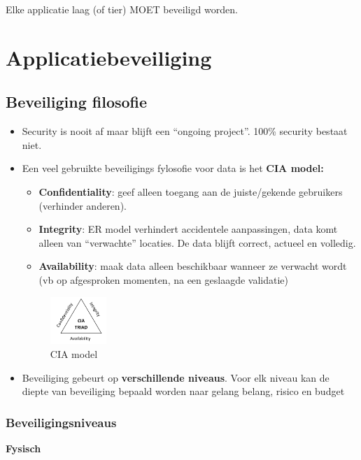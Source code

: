 \documentclass{article}
\newcommand{\bold}[1]{\textbf{#1}}
\begin{document}
Elke applicatie laag (of tier) MOET beveiligd worden.

\section{Applicatiebeveiliging}
\subsection{Beveiliging filosofie}
\begin{itemize}
    \item Security is nooit af maar blijft een “ongoing project”. 100\% security bestaat niet.
    \item Een veel gebruikte beveiligings fylosofie voor data is het \bold{CIA model:}
    \begin{itemize}
        \item \bold{Confidentiality}: geef alleen toegang aan de juiste/gekende gebruikers (verhinder anderen).
        \item \bold{Integrity}: ER model verhindert accidentele aanpassingen, data komt alleen van “verwachte” locaties. De data blijft correct, actueel en volledig.
        \item \bold{Availability}: maak data alleen beschikbaar wanneer ze verwacht wordt (vb op afgesproken momenten, na een geslaagde validatie)
    \end{itemize}

    \begin{figure}[H]
        \centering
        \includegraphics[width=0.2\textwidth]{ciamodel.png}
        \caption{CIA model}
    \end{figure}

    \item Beveiliging gebeurt op \bold{verschillende niveaus}. Voor elk niveau kan de diepte van beveiliging bepaald worden naar gelang belang, risico en budget

\end{itemize}

\subsubsection{Beveiligingsniveaus}
\bold{Fysisch}
\end{document}
